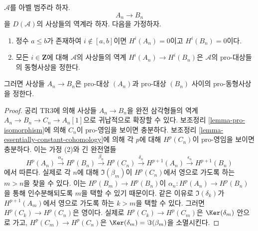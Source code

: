 \begin{lemma}
\label{lemma-pro-isomorphism-bis}
$\mathcal{A}$를 아벨 범주라 하자.
$$
A_n \to B_n
$$
을 $D(\mathcal{A})$의 사상들의 역계라 하자. 다음을 가정하자.
\begin{enumerate}
\item 정수 $a \leq b$가 존재하여 $i \not \in [a, b]$이면
$H^i(A_n) = 0$이고 $H^i(B_n) = 0$이다.
\item 모든 $i \in \mathbf{Z}$에 대해 $\mathcal{A}$의 사상들의 역계
$H^i(A_n) \to H^i(B_n)$은 $\mathcal{A}$의 pro-대상들의 동형사상을
정한다.
\end{enumerate}
그러면 사상들 $A_n \to B_n$은 pro-대상 $(A_n)$과 pro-대상 $(B_n)$
사이의 pro-동형사상을 정한다.
\end{lemma}

\begin{proof}
공리 TR3에 의해 사상들 $A_n \to B_n$을 완전 삼각형들의 역계
$A_n \to B_n \to C_n \to A_n[1]$으로 귀납적으로 확장할 수 있다.
보조정리 \ref{lemma-pro-isomorphism}에 의해 $C_n$이 pro-영임을 보이면
충분하다. 보조정리 \ref{lemma-essentially-constant-cohomology}에 의해
각 $p$에 대해 $H^p(C_n)$이 pro-영임을 보이면 충분하다. 이는 가정
(2)와 긴 완전열들
$$
H^p(A_n) \xrightarrow{\alpha_n} H^p(B_n)
\xrightarrow{\beta_n}
H^p(C_n) \xrightarrow{\delta_n} H^{p + 1}(A_n)
\xrightarrow{\epsilon_n}
H^{p + 1}(B_n)
$$
에서 따른다. 실제로 각 $n$에 대해 $\Im(\beta_m)$이 $H^p(C_n)$에서
영으로 가도록 하는 $m > n$을 찾을 수 있다. 이는
$H^p(B_m) \to H^p(B_n)$이
$\alpha_n : H^p(A_n) \to H^p(B_n)$을 통해 인수분해되도록 $m$을
택할 수 있기 때문이다. 같은 이유로 $\Im(\delta_k)$가
$H^{p + 1}(A_m)$에서 영으로 가도록 하는 $k > m$을 택할 수 있다.
그러면 $H^p(C_k) \to H^p(C_n)$은 영이다. 실제로
$H^p(C_k) \to H^p(C_m)$은 $\Ker(\delta_m)$ 안으로 가고,
$H^p(C_m) \to H^p(C_n)$은
$\Ker(\delta_m) = \Im(\beta_m)$을 소멸시킨다.
\end{proof}







